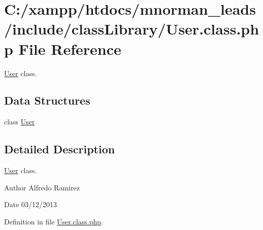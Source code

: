 \hypertarget{_user_8class_8php}{\section{C\-:/xampp/htdocs/mnorman\-\_\-leads/include/class\-Library/\-User.class.\-php File Reference}
\label{_user_8class_8php}
}


\hyperlink{class_user}{User} class.  


\subsection*{Data Structures}
\begin{DoxyCompactItemize}
\item 
class \hyperlink{class_user}{User}
\end{DoxyCompactItemize}


\subsection{Detailed Description}
\hyperlink{class_user}{User} class. \begin{DoxyAuthor}{Author}
Alfredo Ramirez 
\end{DoxyAuthor}
\begin{DoxyDate}{Date}
03/12/2013 
\end{DoxyDate}


Definition in file \hyperlink{_user_8class_8php_source}{User.\-class.\-php}.

